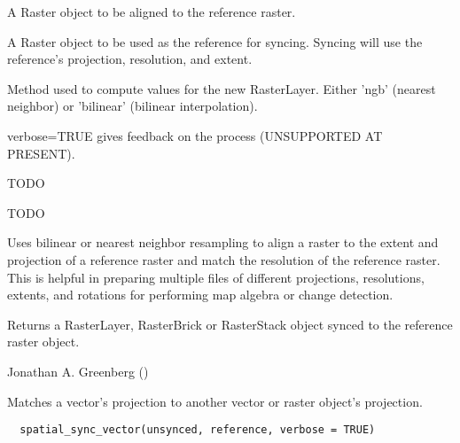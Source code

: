\documentclass[a4paper]{book}
\begin{document}
\begin{Arguments}
\begin{ldescription}
\item[\code{unsynced}] A Raster object to be aligned to the
reference raster.

\item[\code{reference}] A Raster object to be used as the
reference for syncing. Syncing will use the reference's
projection, resolution, and extent.

\item[\code{method}] Method used to compute values for the new
RasterLayer. Either 'ngb' (nearest neighbor) or
'bilinear' (bilinear interpolation).

\item[\code{verbose}] verbose=TRUE gives feedback on the process
(UNSUPPORTED AT PRESENT).

\item[\code{size\_only}] TODO

\item[\code{raster\_size}] TODO
\end{ldescription}
\end{Arguments}
%
\begin{Details}\relax
Uses bilinear or nearest neighbor resampling to align a
raster to the extent and projection of a reference raster
and match the resolution of the reference raster.  This
is helpful in preparing multiple files of different
projections, resolutions, extents, and rotations for
performing map algebra or change detection.
\end{Details}
%
\begin{Value}
Returns a RasterLayer, RasterBrick or RasterStack object
synced to the reference raster object.
\end{Value}
%
\begin{Author}\relax
Jonathan A. Greenberg
()
\end{Author}
%
\begin{Description}\relax
Matches a vector's projection to another vector or raster
object's projection.
\end{Description}
%
\begin{Usage}
\begin{verbatim}
  spatial_sync_vector(unsynced, reference, verbose = TRUE)
\end{verbatim}
\end{Usage}
\end{document}
